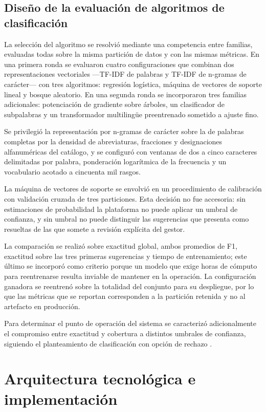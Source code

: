 \subsection{Diseño de la evaluación de algoritmos de clasificación}
La selección del algoritmo se resolvió mediante una competencia entre familias, evaluadas todas sobre la misma partición de datos y con las mismas métricas. En una primera ronda se evaluaron cuatro configuraciones que combinan dos representaciones vectoriales —TF-IDF de palabras y TF-IDF de n-gramas de carácter— con tres algoritmos: regresión logística, máquina de vectores de soporte lineal y bosque aleatorio. En una segunda ronda se incorporaron tres familias adicionales: potenciación de gradiente sobre árboles, un clasificador de subpalabras y un transformador multilingüe preentrenado sometido a ajuste fino.

Se privilegió la representación por n-gramas de carácter sobre la de palabras completas por la densidad de abreviaturas, fracciones y designaciones alfanuméricas del catálogo, y se configuró con ventanas de dos a cinco caracteres delimitadas por palabra, ponderación logarítmica de la frecuencia y un vocabulario acotado a cincuenta mil rasgos.

La máquina de vectores de soporte se envolvió en un procedimiento de calibración con validación cruzada de tres particiones. Esta decisión no fue accesoria: sin estimaciones de probabilidad la plataforma no puede aplicar un umbral de confianza, y sin umbral no puede distinguir las sugerencias que presenta como resueltas de las que somete a revisión explícita del gestor.

La comparación se realizó sobre exactitud global, ambos promedios de F1, exactitud sobre las tres primeras sugerencias y tiempo de entrenamiento; este último se incorporó como criterio porque un modelo que exige horas de cómputo para reentrenarse resulta inviable de mantener en la operación. La configuración ganadora se reentrenó sobre la totalidad del conjunto para su despliegue, por lo que las métricas que se reportan corresponden a la partición retenida y no al artefacto en producción.

Para determinar el punto de operación del sistema se caracterizó adicionalmente el compromiso entre exactitud y cobertura a distintos umbrales de confianza, siguiendo el planteamiento de clasificación con opción de rechazo \cite{chow1970}.

\section{Arquitectura tecnológica e implementación}

